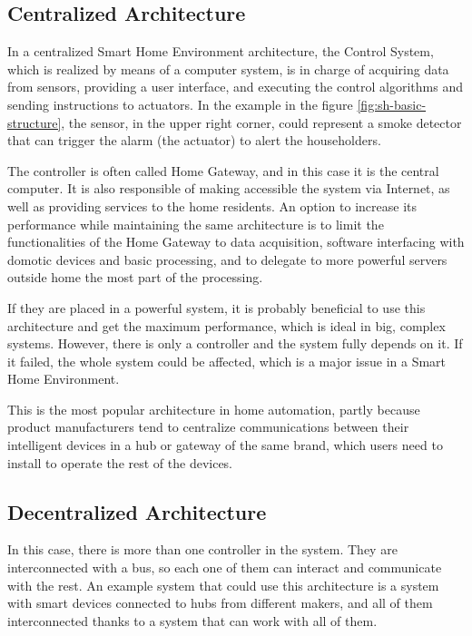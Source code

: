 \subsection{Centralized Architecture}
In a centralized Smart Home Environment architecture, the Control System, which is realized by means of a computer
system, is in charge of acquiring data from sensors, providing a user interface, and executing the control algorithms and
sending instructions to actuators.\cite{badica13} In the example in the figure \ref{fig:sh-basic-structure}, the sensor, in the
upper right corner, could represent a smoke detector that can trigger the alarm (the actuator) to alert the householders.

The controller is often called Home Gateway, and in this case it is the central computer. It is also responsible of making
accessible the system via Internet, as well as providing services to the home residents. An option to increase its performance
while maintaining the same architecture is to limit the functionalities of the Home Gateway to data acquisition, software
interfacing with domotic devices and basic processing, and to delegate to more powerful servers outside home the most
part of the processing.

If they are placed in a powerful system, it is probably beneficial to use this architecture and get the maximum performance,
which is ideal in big, complex systems.\cite{raulCarreteroElegir} However, there is only a controller and the system fully depends
on it. If it failed, the whole system could be affected, which is a major issue in a Smart Home Environment.

This is the most popular architecture in home automation, partly because product manufacturers tend to centralize communications
between their intelligent devices in a hub or gateway of the same brand, which users need to install to operate the rest of the devices.

\subsection{Decentralized Architecture}
In this case, there is more than one controller in the system. They are interconnected with a bus, so each one of them can interact
and communicate with the rest. An example system that could use this architecture is a system with smart devices connected to
hubs from different makers, and all of them interconnected thanks to a system that can work with all of them.


